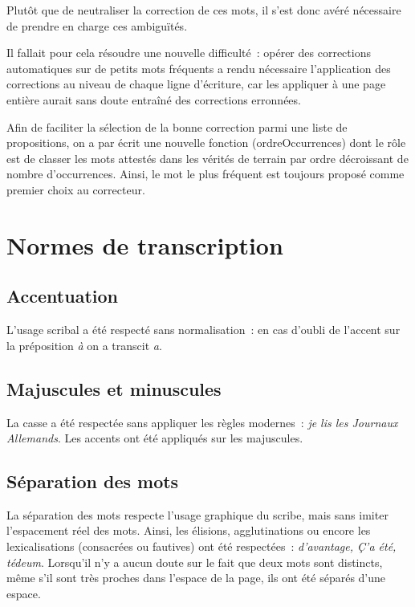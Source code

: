 \documentclass[a4paper,12pt,twoside]{book}
\begin{document}
				Plutôt que de neutraliser la correction de ces mots, il s'est donc avéré nécessaire de prendre en charge ces ambiguïtés.
				
				Il fallait pour cela résoudre une nouvelle difficulté~: opérer des corrections automatiques sur de petits mots fréquents a rendu nécessaire l'application des corrections au niveau de chaque ligne d'écriture, car les appliquer à une page entière aurait sans doute entraîné des corrections erronnées.
						
				Afin de faciliter la sélection de la bonne correction parmi une liste de propositions, on a par écrit une nouvelle fonction (\textsf{ordreOccurrences}) dont le rôle est de classer les mots attestés dans les vérités de terrain par ordre décroissant de nombre d'occurrences. Ainsi, le mot le plus fréquent est toujours proposé comme premier choix au correcteur.
			
	\appendix
	
	\renewcommand{\appendixpagename}{Annexes}
	
	\renewcommand{\appendixtocname}{Annexes}
	
	\addappheadtotoc%
	
	\appendixpage %
	\chapter{Normes de transcription}
	
		\section{Accentuation}
			L'usage scribal a été respecté sans normalisation~: en cas d'oubli de l'accent sur la préposition \textit{à} on a transcit \textit{a}.
		
		\section{Majuscules et minuscules}
			La casse a été respectée sans appliquer les règles modernes~: \textit{je lis les Journaux Allemands}. Les accents ont été appliqués sur les majuscules.
		
		\section{Séparation des mots}
			La séparation des mots respecte l'usage graphique du scribe, mais sans imiter l'espacement réel des mots. Ainsi, les élisions, agglutinations ou encore les lexicalisations (consacrées ou fautives) ont été respectées~: \textit{d'avantage, Ç'a été, tédeum}. Lorsqu'il n'y a aucun doute sur le fait que deux mots sont distincts, même s'il sont très proches dans l'espace de la page, ils ont été séparés d'une espace.
		
\end{document}
